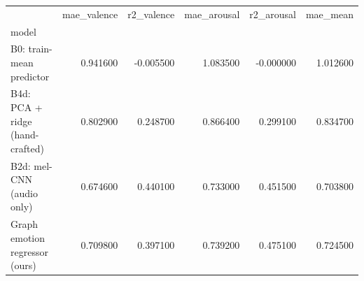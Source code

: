 \begin{tabular}{lrrrrr}
\toprule
 & mae\_valence & r2\_valence & mae\_arousal & r2\_arousal & mae\_mean \\
model &  &  &  &  &  \\
\midrule
B0: train-mean predictor & 0.941600 & -0.005500 & 1.083500 & -0.000000 & 1.012600 \\
B4d: PCA + ridge (hand-crafted) & 0.802900 & 0.248700 & 0.866400 & 0.299100 & 0.834700 \\
B2d: mel-CNN (audio only) & 0.674600 & 0.440100 & 0.733000 & 0.451500 & 0.703800 \\
Graph emotion regressor (ours) & 0.709800 & 0.397100 & 0.739200 & 0.475100 & 0.724500 \\
\bottomrule
\end{tabular}
